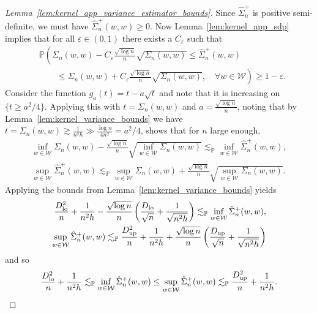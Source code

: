 \documentclass[11pt,lof]{puthesis}
\renewcommand{\P}{\ensuremath{\mathbb{P}}}
\newcommand{\cW}{\ensuremath{\mathcal{W}}}
\newcommand{\Dl}{\ensuremath{D_{\textup{lo}}}}
\newcommand{\Du}{\ensuremath{D_{\textup{up}}}}
\theoremstyle{break}
\theoremstyle{proof}
\newtheorem{proof}{Proof}
\begin{document}
\begin{proof}[Lemma~\ref{lem:kernel_app_variance_estimator_bounds}]

  Since $\hat \Sigma_n^+$ is positive semi-definite,
  we must have $\hat \Sigma_n^+(w,w) \geq 0$.
  Now Lemma~\ref{lem:kernel_app_sdp}
  implies that for all $\varepsilon \in (0,1)$
  there exists a $C_\varepsilon$ such that
  \begin{align*}
    &\P\left(
      \Sigma_n(w,w) - C_\varepsilon \frac{\sqrt{\log n}}{n} \sqrt{\Sigma_n(w,w)}
      \leq
      \hat \Sigma_n^+(w,w)
    \right.
    \\
    &\left.
      \qquad\leq
      \Sigma_n(w,w) + C_\varepsilon \frac{\sqrt{\log n}}{n}
      \sqrt{\Sigma_n(w,w)},
      \quad \forall w \in \cW
    \right)
    \geq 1-\varepsilon.
  \end{align*}
  Consider the function
  $g_a(t) = t - a \sqrt{t}$
  and note that it is increasing on $\{t \geq a^2/4\}$.
  Applying this with $t = \Sigma_n(w,w)$
  and $a = \frac{\sqrt{\log n}}{n}$,
  noting that by Lemma~\ref{lem:kernel_variance_bounds} we have
  $t = \Sigma_n(w,w) \gtrsim \frac{1}{n^2h}
  \gg \frac{\log n}{4n^2} = a^2/4$,
  shows that for $n$ large enough,
  \begin{align*}
    \inf_{w \in \cW} \Sigma_n(w,w)
    - \frac{\sqrt{\log n}}{n} \sqrt{\inf_{w \in \cW} \Sigma_n(w,w)}
    \lesssim_\P
    \inf_{w \in \cW}\hat \Sigma_n^+(w,w), \\
    \sup_{w \in \cW}\hat \Sigma_n^+(w,w)
    \lesssim_\P
    \sup_{w \in \cW} \Sigma_n(w,w)
    + \frac{\sqrt{\log n}}{n} \sqrt{\sup_{w \in \cW} \Sigma_n(w,w)}.
  \end{align*}
  Applying the bounds from Lemma~\ref{lem:kernel_variance_bounds}
  yields
  \begin{align*}
    \frac{\Dl^2}{n} + \frac{1}{n^2h}
    - \frac{\sqrt{\log n}}{n}
    \left( \frac{\Dl}{\sqrt n} + \frac{1}{\sqrt{n^2h}} \right)
    \lesssim_\P
    \inf_{w \in \cW}\hat \Sigma_n^+(w,w), \\
    \sup_{w \in \cW}\hat \Sigma_n^+(w,w)
    \lesssim_\P
    \frac{\Du^2}{n} + \frac{1}{n^2h}
    + \frac{\sqrt{\log n}}{n}
    \left( \frac{\Du}{\sqrt n} + \frac{1}{\sqrt{n^2h}} \right)
  \end{align*}
  and so
  \begin{align*}
    \frac{\Dl^2}{n} + \frac{1}{n^2h}
    \lesssim_\P
    \inf_{w \in \cW}\hat \Sigma_n^+(w,w)
    \leq
    \sup_{w \in \cW}\hat \Sigma_n^+(w,w)
    \lesssim_\P
    \frac{\Du^2}{n} + \frac{1}{n^2h}.
  \end{align*}
\end{proof}
\end{document}
